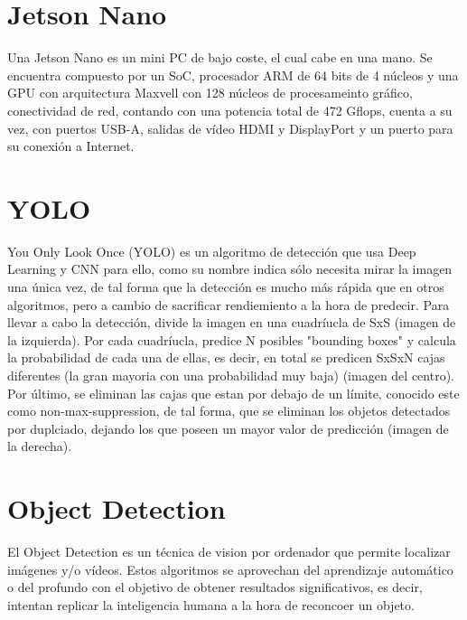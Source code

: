 
\section{Jetson Nano}

Una Jetson Nano \cite{jetsonNano} es un mini PC de bajo coste, el cual cabe en una mano. Se encuentra compuesto por un SoC, procesador ARM de 64 bits de 4 núcleos y una GPU con arquitectura Maxvell con 128 núcleos de procesameinto gráfico, conectividad de red, 
contando con una potencia total de 472 Gflops, cuenta a su vez, con puertos USB-A, salidas de vídeo HDMI y DisplayPort y un puerto para su conexión a Internet.


\section{YOLO}

You Only Look Once (YOLO) \cite{yolov4} es un algoritmo de detección que usa Deep Learning y CNN para ello, como su nombre indica sólo necesita mirar la imagen una única vez, de tal forma que la detección es mucho más rápida que en otros algoritmos, pero a cambio de sacrificar rendiemiento a la hora de predecir.
Para llevar a cabo la detección, divide la imagen en una cuadríucla de SxS (imagen de la izquierda). Por cada cuadríucla, predice N posibles "bounding boxes" y calcula la probabilidad de cada una de ellas, es decir, en total se predicen SxSxN cajas diferentes (la gran mayoria con una probabilidad muy baja) (imagen del centro). 
Por último, se eliminan las cajas que estan por debajo de un límite, conocido este como non-max-suppression, de tal forma, que se eliminan los objetos detectados por duplciado, dejando los que poseen un mayor valor de predicción (imagen de la derecha).


\section{Object Detection}

El Object Detection \cite{objectDetect} es un técnica de vision por ordenador que permite localizar imágenes y/o vídeos. Estos algoritmos se aprovechan del aprendizaje automático o del profundo 
con el objetivo de obtener resultados significativos, es decir, intentan replicar la inteligencia humana a la hora de reconcoer un objeto.

